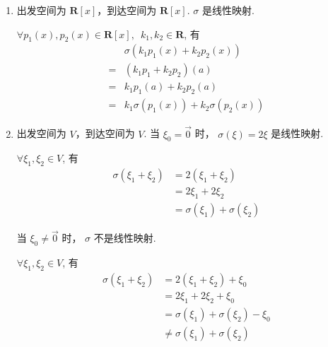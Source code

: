 \documentclass[UTF8,12pt,a4paper,fontset=fandol]{ctexart}
\begin{document}
\begin{solve}
\begin{enumerate}
        \item 出发空间为 $ \mathbf{R}[x] $，到达空间为 $ \mathbf{R}[x] $. $ \sigma $ 是线性映射.

              $ \forall p_1(x), p_2(x) \in \mathbf{R}[x],\enspace k_1, k_2 \in \mathbf{R} $, 有
              \begin{align*}
                      & \sigma(k_1 p_1(x) + k_2 p_2(x))         \\
                  ={} & (k_1 p_1 + k_2 p_2)(a)                  \\
                  ={} & k_1 p_1(a) + k_2 p_2(a)                 \\
                  ={} & k_1 \sigma(p_1(x)) + k_2 \sigma(p_2(x))
              \end{align*}

        \item 出发空间为 $ V $，到达空间为 $ V $. 当 $ \xi_0 = \vec{0} $ 时， $ \sigma(\xi) = 2 \xi $ 是线性映射.

              $ \forall \xi_1, \xi_2 \in V $, 有
              \begin{align*}
                  \sigma(\xi_1 + \xi_2) & = 2(\xi_1 + \xi_2)              \\
                                        & = 2 \xi_1 + 2 \xi_2             \\
                                        & = \sigma(\xi_1) + \sigma(\xi_2)
              \end{align*}

              当 $ \xi_0 \neq \vec{0} $ 时， $ \sigma $ 不是线性映射.

              $ \forall \xi_1, \xi_2 \in V $, 有
              \begin{align*}
                  \sigma(\xi_1 + \xi_2) & = 2(\xi_1 + \xi_2) + \xi_0              \\
                                        & = 2 \xi_1 + 2 \xi_2 + \xi_0             \\
                                        & = \sigma(\xi_1) + \sigma(\xi_2) - \xi_0 \\
                                        & \neq \sigma(\xi_1) + \sigma(\xi_2)
              \end{align*}
    \end{enumerate}
\end{solve}
\end{document}
